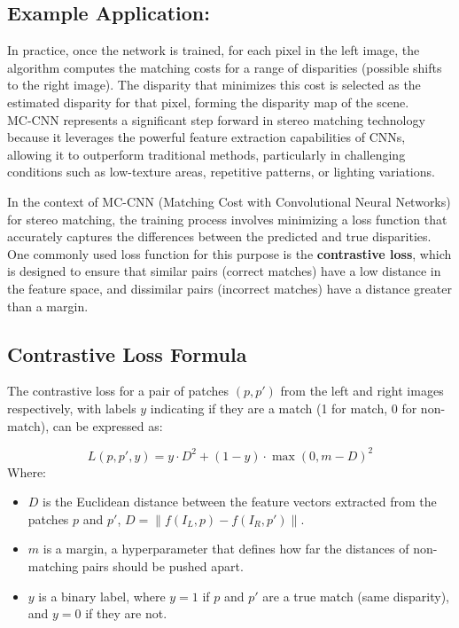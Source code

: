 \documentclass[22pt]{report}
\begin{document}
\subsection*{Example Application:}
In practice, once the network is trained, for each pixel in the left image, the algorithm computes the matching costs for a range of disparities (possible shifts to the right image). The disparity that minimizes this cost is selected as the estimated disparity for that pixel, forming the disparity map of the scene.
\\
MC-CNN represents a significant step forward in stereo matching technology because it leverages the powerful feature extraction capabilities of CNNs, allowing it to outperform traditional methods, particularly in challenging conditions such as low-texture areas, repetitive patterns, or lighting variations.

In the context of MC-CNN (Matching Cost with Convolutional Neural Networks) for stereo matching, the training process involves minimizing a loss function that accurately captures the differences between the predicted and true disparities. One commonly used loss function for this purpose is the \textbf{contrastive loss}, which is designed to ensure that similar pairs (correct matches) have a low distance in the feature space, and dissimilar pairs (incorrect matches) have a distance greater than a margin.\\
\subsection{Contrastive Loss Formula}
The contrastive loss for a pair of patches \( (p, p') \) from the left and right images respectively, with labels \( y \) indicating if they are a match (1 for match, 0 for non-match), can be expressed as:

\[
L(p, p', y) = y \cdot D^2 + (1 - y) \cdot \max(0, m - D)^2
\]
Where:
\begin{itemize}
    \item \( D \) is the Euclidean distance between the feature vectors extracted from the patches \( p \) and \( p' \), \( D = \| f(I_L, p) - f(I_R, p') \| \).
    \item \( m \) is a margin, a hyperparameter that defines how far the distances of non-matching pairs should be pushed apart.
    \item \( y \) is a binary label, where \( y = 1 \) if \( p \) and \( p' \) are a true match (same disparity), and \( y = 0 \) if they are not.
\end{itemize}
\vspace{20}
\end{document}
